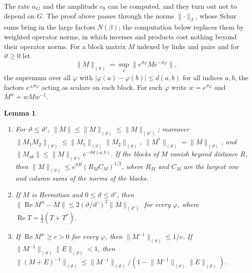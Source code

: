 \documentclass[11pt]{amsart}
\newtheorem{lemma}[theorem]{Lemma}
\theoremstyle{definition}
\theoremstyle{remark}
\numberwithin{equation}{section}
\begin{document}
The rate $\alpha_G$ and the amplitude $c_9$ can be computed, and they turn
out not to depend on $G$. The proof above passes through the norms
$\lVert\cdot\rVert_\beta$, whose Schur sums bring in the large factors
$N(\beta)$; the computation below replaces them by weighted operator norms,
in which inverses and products cost nothing beyond their operator norms. For
a block matrix $M$ indexed by links and pairs and for $\vartheta\ge0$ let
\[
\lVert M\rVert_{(\vartheta)}=\sup_\varphi\bigl\lVert e^{\vartheta\varphi}
Me^{-\vartheta\varphi}\bigr\rVert,
\]
the supremum over all $\varphi$ with $|\varphi(a)-\varphi(b)|\le d(a,b)$
for all indices $a,b$, the factors $e^{\pm\vartheta\varphi}$ acting as
scalars on each block. For such $\varphi$ write $w=e^{\vartheta\varphi}$
and $M^w=wMw^{-1}$.

\begin{lemma}\label{lem:weightednorms}
\begin{enumerate}[label=\textup{(\roman*)},leftmargin=*]
\item For $\vartheta\le\vartheta'$, $\lVert M\rVert\le\lVert M\rVert_{(
\vartheta)}\le\lVert M\rVert_{(\vartheta')}$; moreover $\lVert M_1M_2\rVert
_{(\vartheta)}\le\lVert M_1\rVert_{(\vartheta)}\lVert M_2\rVert_{(\vartheta)}$,
$\lVert M^*\rVert_{(\vartheta)}=\lVert M\rVert_{(\vartheta)}$, and $\lVert
M_{ab}\rVert\le\lVert M\rVert_{(\vartheta)}e^{-\vartheta d(a,b)}$. If the
blocks of $M$ vanish beyond distance $R$, then $\lVert M\rVert_{(\vartheta)}
\le e^{\vartheta R}(R_MC_M)^{1/2}$, where $R_M$ and $C_M$ are the largest
row and column sums of the norms of the blocks.
\item If $M$ is Hermitian and $0\le\vartheta\le\vartheta'$, then $\lVert
\operatorname{Re}M^w-M\rVert\le2(\vartheta/\vartheta')^2\lVert M\rVert
_{(\vartheta')}$ for every $\varphi$, where $\operatorname{Re}T=\frac12(T+
T^*)$.
\item If $\operatorname{Re}M^w\ge c>0$ for every $\varphi$, then $\lVert
M^{-1}\rVert_{(\vartheta)}\le1/c$. If $\lVert M^{-1}\rVert_{(\vartheta)}
\lVert E\rVert_{(\vartheta)}<1$, then $\lVert(M+E)^{-1}\rVert_{(\vartheta)}
\le\lVert M^{-1}\rVert_{(\vartheta)}/(1-\lVert M^{-1}\rVert_{(\vartheta)}
\lVert E\rVert_{(\vartheta)})$.
\end{enumerate}
\end{lemma}
\end{document}
